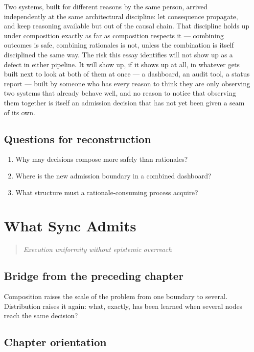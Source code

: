 \documentclass[11pt,openany]{book}
\newcommand{\chapterprecis}[1]{\begin{quote}\itshape #1\end{quote}}
\begin{document}
Two systems, built for different reasons by the same person, arrived independently at the same architectural discipline: let consequence propagate, and keep reasoning available but out of the causal chain. That discipline holds up under composition exactly as far as composition respects it — combining outcomes is safe, combining rationales is not, unless the combination is itself disciplined the same way. The risk this essay identifies will not show up as a defect in either pipeline. It will show up, if it shows up at all, in whatever gets built next to look at both of them at once — a dashboard, an audit tool, a status report — built by someone who has every reason to think they are only observing two systems that already behave well, and no reason to notice that observing them together is itself an admission decision that has not yet been given a seam of its own.

\section*{Questions for reconstruction}

\begin{enumerate}

\item Why may decisions compose more safely than rationales?

\item Where is the new admission boundary in a combined dashboard?

\item What structure must a rationale-consuming process acquire?

\end{enumerate}

\chapter{What Sync Admits}

\chapterprecis{Execution uniformity without epistemic overreach}

\section*{Bridge from the preceding chapter}

Composition raises the scale of the problem from one boundary to several. Distribution raises it again: what, exactly, has been learned when several nodes reach the same decision?

\section*{Chapter orientation}
\end{document}
